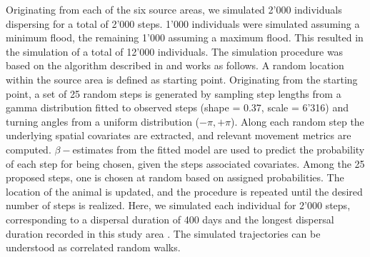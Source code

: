 \documentclass[abstract=on,10pt,a4paper,bibliography=totocnumbered]{article}
\begin{document}
Originating from each of the six source areas, we simulated 2'000 individuals
dispersing for a total of 2'000 steps. 1'000 individuals were simulated assuming
a minimum flood, the remaining 1'000 assuming a maximum flood. This resulted in
the simulation of a total of 12'000 individuals. The simulation procedure was
based on the algorithm described in \cite{Hofmann.2023} and works as follows. A
random location within the source area is defined as starting point. Originating
from the starting point, a set of 25 random steps is generated by sampling step
lengths from a gamma distribution fitted to observed steps (shape = 0.37, scale
= 6'316) and turning angles from a uniform distribution ($-\pi, +\pi$). Along
each random step the underlying spatial covariates are extracted, and relevant
movement metrics are computed. \(\beta-\)estimates from the fitted model are
used to predict the probability of each step for being chosen, given the steps
associated covariates. Among the 25 proposed steps, one is chosen at random
based on assigned probabilities. The location of the animal is updated, and the
procedure is repeated until the desired number of steps is realized. Here, we
simulated each individual for 2'000 steps, corresponding to a dispersal duration
of 400 days and the longest dispersal duration recorded in this study area
\citep{Cozzi.2020, Hofmann.2021}. The simulated trajectories can be understood
as correlated random walks.
\end{document}
